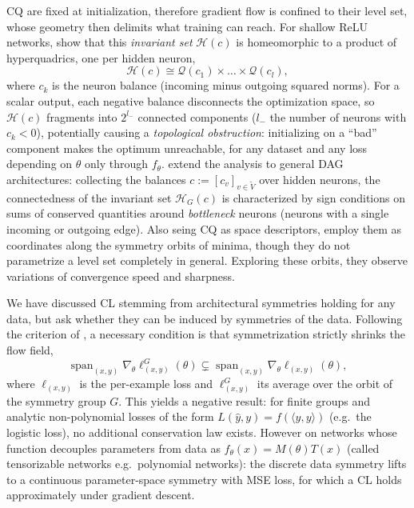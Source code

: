 \documentclass[mathematics,review,submit,moreauthors]{Definitions/mdpi}
\begin{document}
CQ are fixed at initialization, therefore gradient flow is confined to their level set, whose geometry then delimits what training can reach.
For shallow ReLU networks, \citet{nurisso2024a} show that this \emph{invariant set} $\mathcal{H}(c)$ is homeomorphic to a product of hyperquadrics, one per hidden neuron,
\begin{equation*}
    \mathcal{H}(c)\cong\mathcal{Q}(c_1)\times\dots\times\mathcal{Q}(c_l),
\end{equation*}
where $c_k$ is the neuron balance (incoming minus outgoing squared norms).
For a scalar output, each negative balance disconnects the optimization space, so $\mathcal{H}(c)$ fragments into $2^{l_-}$ connected components ($l_-$ the number of neurons with $c_k<0$), potentially causing a \emph{topological obstruction}: initializing on a ``bad'' component makes the optimum unreachable, for any dataset and any loss depending on $\theta$ only through $f_\theta$.
\citet{nurisso2025} extend the analysis to general DAG architectures: collecting the balances $c:=[c_v]_{v\in\tilde{V}}$ over hidden neurons, the connectedness of the invariant set $\mathcal{H}_G(c)$ is characterized by sign conditions on sums of conserved quantities around \emph{bottleneck} neurons (neurons with a single incoming or outgoing edge).
Also seing CQ as space descriptors, \citet{zhao2023a} employ them as coordinates along the symmetry orbits of minima, though they do not parametrize a level set completely in general.
Exploring these orbits, they observe variations of convergence speed and sharpness.

We have discussed CL stemming from architectural symmetries holding for any data, but \citet{galley2026} ask whether they can be induced by symmetries of the data.
Following the criterion of \citet{marcotte2023}, a necessary condition is that symmetrization strictly shrinks the flow field,
\begin{equation*}
    \operatorname{span}_{(x,y)}\nabla_\theta\ell^G_{(x,y)}(\theta)\subsetneq\operatorname{span}_{(x,y)}\nabla_\theta\ell_{(x,y)}(\theta),
\end{equation*}
where $\ell_{(x,y)}$ is the per-example loss and $\ell^G_{(x,y)}$ its average over the orbit of the symmetry group $G$.
This yields a negative result: for finite groups and analytic non-polynomial losses of the form $L(\hat y,y)=f(\langle\hat y,y\rangle)$ (e.g.\ the logistic loss), no additional conservation law exists.
However on networks whose function decouples parameters from data as $f_\theta(x)=M(\theta)T(x)$ (called tensorizable networks e.g.\ polynomial networks): the discrete data symmetry lifts to a continuous parameter-space symmetry with MSE loss, for which a CL holds approximately under gradient descent.
\end{document}

